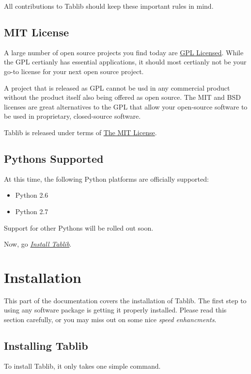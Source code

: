 \documentclass[a4paper,12pt,english]{sphinxmanual}
\begin{document}
All contributions to Tablib should keep these important rules in mind.


\section{MIT License}
\label{intro:mit}\label{intro:mit-license}
A large number of open source projects you find today are \href{http://www.opensource.org/licenses/gpl-license.php}{GPL Licensed}. While the GPL certianly has essential applications, it should most certianly not be your go-to license for your next open source project.

A project that is released as GPL cannot be usd in any commercial product without the product itself also being offered as open source. The MIT and BSD licenses are great alternatives to the GPL that allow your open-source software to be used in proprietary, closed-source software.

Tablib is released under terms of \href{http://www.opensource.org/licenses/mit-license.php}{The MIT License}.


\section{Pythons Supported}
\label{intro:pythons-supported}\label{intro:pythonsupport}
At this time, the following Python platforms are officially supported:
\begin{itemize}
\item {} 
Python 2.6

\item {} 
Python 2.7

\end{itemize}

Support for other Pythons will be rolled out soon.

Now, go {\hyperref[install:install]{\emph{Install Tablib}}}.


\chapter{Installation}
\label{install:installation}\label{install::doc}\label{install:install}
This part of the documentation covers the installation of Tablib. The first step to using any software package is getting it properly installed. Please read this section carefully, or you may miss out on some nice  \emph{speed enhancments}.


\section{Installing Tablib}
\label{install:installing-tablib}\label{install:installing}
To install Tablib, it only takes one simple command.
\end{document}
